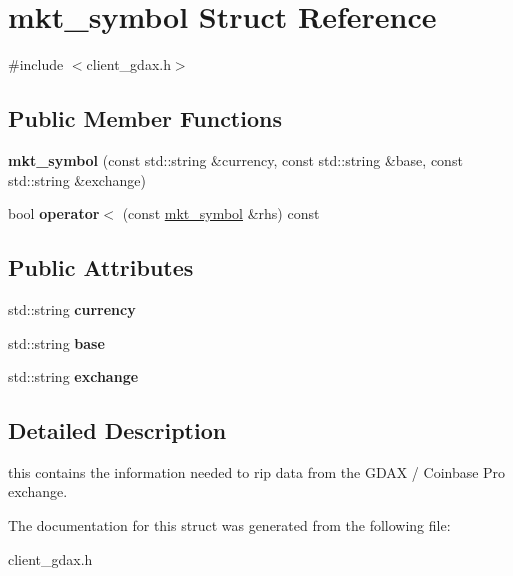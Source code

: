 \hypertarget{structmkt__symbol}{}\section{mkt\+\_\+symbol Struct Reference}
\label{structmkt__symbol}


{\ttfamily \#include $<$client\+\_\+gdax.\+h$>$}

\subsection*{Public Member Functions}
\begin{DoxyCompactItemize}
\item 
\mbox{\label{structmkt__symbol_a1ca87087e2847223a7524f95a5ff2c62}} 
{\bfseries mkt\+\_\+symbol} (const std\+::string \&currency, const std\+::string \&base, const std\+::string \&exchange)
\item 
\mbox{\label{structmkt__symbol_a0ff3b45c2c116088918c2b22a9b04619}} 
bool {\bfseries operator$<$} (const \mbox{\hyperlink{structmkt__symbol}{mkt\+\_\+symbol}} \&rhs) const
\end{DoxyCompactItemize}
\subsection*{Public Attributes}
\begin{DoxyCompactItemize}
\item 
\mbox{\label{structmkt__symbol_afae81f88b7fa2e4f150b4ec169e828ec}} 
std\+::string {\bfseries currency}
\item 
\mbox{\label{structmkt__symbol_a6b2229ecc080f3a0cac9697023cc32e2}} 
std\+::string {\bfseries base}
\item 
\mbox{\label{structmkt__symbol_aa29eca3e55011ca83806c30a7df1ebc2}} 
std\+::string {\bfseries exchange}
\end{DoxyCompactItemize}


\subsection{Detailed Description}
this contains the information needed to rip data from the G\+D\+AX / Coinbase Pro exchange. 

The documentation for this struct was generated from the following file\+:\begin{DoxyCompactItemize}
\item 
client\+\_\+gdax.\+h\end{DoxyCompactItemize}
